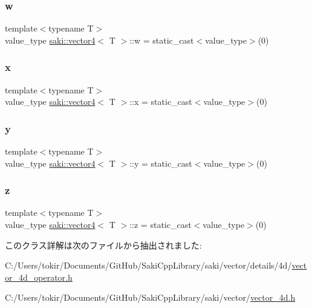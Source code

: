 \subsubsection{\texorpdfstring{w}{w}}
{\footnotesize\ttfamily template$<$typename T$>$ \\
value\+\_\+type \mbox{\hyperlink{classsaki_1_1vector4}{saki\+::vector4}}$<$ T $>$\+::w = static\+\_\+cast$<$value\+\_\+type$>$(0)}

\mbox{\label{classsaki_1_1vector4_a8b2ff4254dd0ba142490c77927bfbf8e}} 
\subsubsection{\texorpdfstring{x}{x}}
{\footnotesize\ttfamily template$<$typename T$>$ \\
value\+\_\+type \mbox{\hyperlink{classsaki_1_1vector4}{saki\+::vector4}}$<$ T $>$\+::x = static\+\_\+cast$<$value\+\_\+type$>$(0)}

\mbox{\label{classsaki_1_1vector4_a827cd630cd250d5fe85290f6671dbe0b}} 
\subsubsection{\texorpdfstring{y}{y}}
{\footnotesize\ttfamily template$<$typename T$>$ \\
value\+\_\+type \mbox{\hyperlink{classsaki_1_1vector4}{saki\+::vector4}}$<$ T $>$\+::y = static\+\_\+cast$<$value\+\_\+type$>$(0)}

\mbox{\label{classsaki_1_1vector4_a42ece0235847ec6ee945516d4dc3ab48}} 
\subsubsection{\texorpdfstring{z}{z}}
{\footnotesize\ttfamily template$<$typename T$>$ \\
value\+\_\+type \mbox{\hyperlink{classsaki_1_1vector4}{saki\+::vector4}}$<$ T $>$\+::z = static\+\_\+cast$<$value\+\_\+type$>$(0)}



このクラス詳解は次のファイルから抽出されました\+:\begin{DoxyCompactItemize}
\item 
C\+:/\+Users/tokir/\+Documents/\+Git\+Hub/\+Saki\+Cpp\+Library/saki/vector/details/4d/\mbox{\hyperlink{vector__4d__operator_8h}{vector\+\_\+4d\+\_\+operator.\+h}}\item 
C\+:/\+Users/tokir/\+Documents/\+Git\+Hub/\+Saki\+Cpp\+Library/saki/vector/\mbox{\hyperlink{vector__4d_8h}{vector\+\_\+4d.\+h}}\end{DoxyCompactItemize}
